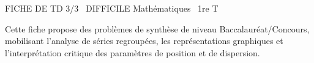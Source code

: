 \documentclass[11pt]{article}
\begin{document}
\begin{tcolorbox}[enhanced,colback=popink,colframe=popink,arc=10pt,boxrule=0pt,left=12pt,right=12pt,top=9pt,bottom=9pt]
{\color{white}\popxbold\small FICHE DE TD 3/3 \textbullet\ DIFFICILE \hfill Mathématiques \textbullet\ 1re T\par}
\end{tcolorbox}
\vspace{4pt}
Cette fiche propose des problèmes de synthèse de niveau Baccalauréat/Concours, mobilisant l'analyse de séries regroupées, les représentations graphiques et l'interprétation critique des paramètres de position et de dispersion.
\end{document}
